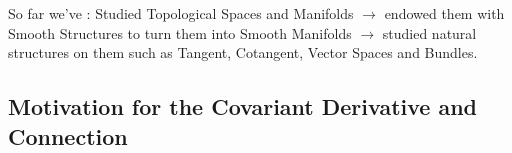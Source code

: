 \documentclass[11pt]{article}
\begin{document}
So far we've : 
Studied Topological Spaces and Manifolds $\rightarrow$ endowed them with Smooth Structures to turn them into Smooth Manifolds $\rightarrow$ studied natural structures on them such as Tangent, Cotangent, Vector Spaces and Bundles.

\vskip 1cm
\subsection{Motivation for the Covariant Derivative and Connection}

\end{document}
